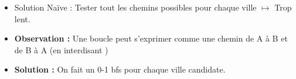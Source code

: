 \begin{frame}
    \frametitle{\problemtitle}
    \begin{itemize}
        \begin{block}{Problème}
            Un graphe avec $n$ villes et $m$ villes candidates, trouver la ville candidate dont le cycle est le plus petit.
        \end{block}
        \item<+-> Solution Naïve : Tester tout les chemins possibles pour chaque ville $\mapsto$ Trop lent.
        \item<+-> \textbf{Observation :} Une boucle peut s'exprimer comme une chemin de A à B et de B à A (en interdisant )
        \item<+-> \textbf{Solution :} On fait un 0-1 bfs pour chaque ville candidate.
    \end{itemize}
\end{frame}
